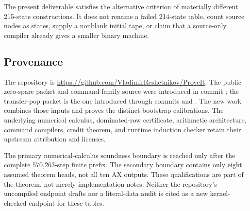 The present deliverable satisfies the alternative criterion of materially different 215-state constructions. It does not rename a failed 214-state table, count source nodes as states, supply a nonblank initial tape, or claim that a source-only compiler already gives a smaller binary machine.

\subsection{Provenance}
The repository is \url{https://github.com/VladimirReshetnikov/ProveIt}. The public zero-spare packet and command-family source were introduced in commit ; the transfer-pop packet is the one introduced through commits  and . The new work combines those inputs and proves the distinct bootstrap calibrations. The underlying numerical calculus, dominated-row certificate, arithmetic architecture, command compilers, credit theorem, and runtime induction checker retain their upstream attribution and licenses.

The primary numerical-calculus soundness boundary is reached only after the complete 570,263-step finite prefix. The secondary boundary contains only eight assumed theorem heads, not all ten AX outputs. These qualifications are part of the theorem, not merely implementation notes. Neither the repository's uncompiled endpoint drafts nor a literal-data audit is cited as a new kernel-checked endpoint for these tables.
